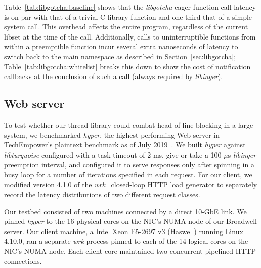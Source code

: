 Table~\ref{tab:libgotcha:baseline} shows that the \textit{libgotcha} eager function
call latency is on par with that of a trivial C library function and one-third
that of a simple system call.  This overhead affects the entire program, regardless
of the
current libset at the time of the call.  Additionally, calls to
uninterruptible functions from within a preemptible function incur several extra
nanoseconds of latency to switch back to the main namespace as described in
Section~\ref{sec:libgotcha}; Table~\ref{tab:libgotcha:whitelist} breaks this down to
show the cost of notification callbacks at the conclusion of such a call (always
required by \textit{libinger}).


\subsection{Web server}

To test whether our thread library could combat head-of-line blocking in a large
system, we benchmarked
\textit{hyper}, the highest-performing Web server in TechEmpower's plaintext
benchmark as of July 2019~\cite{www-hyper}.  We built \textit{hyper} against
\textit{libturquoise} configured with a task timeout of 2 ms, give or take a
100-$\mu$s \textit{libinger} preemption interval, and configured it to serve
responses only after spinning in a busy loop for a number of iterations specified in
each request.  For our client, we modified version 4.1.0 of the
\textit{wrk}~\cite{www-wrk} closed-loop HTTP load generator to separately record the
latency distributions of two different request classes.

Our testbed consisted of two machines connected by a direct 10-GbE link.  We pinned
\textit{hyper} to the 16 physical cores on the NIC's NUMA node of our Broadwell
server.  Our client machine, a Intel Xeon E5-2697 v3 (Haswell) running Linux 4.10.0,
ran a separate \textit{wrk} process pinned to each of the 14 logical cores on the
NIC's NUMA node.  Each client core maintained two concurrent pipelined HTTP
connections.

